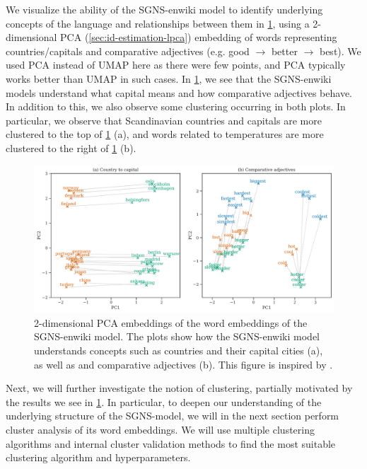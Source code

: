 We visualize the ability of the SGNS-enwiki model to identify underlying concepts of the language and relationships between them in \cref{fig:sgns-enwiki-word-to-word-relations-pca-2d}, using a 2-dimensional PCA (\cref{sec:id-estimation-lpca}) embedding of words representing countries/capitals and comparative adjectives (e.g. good $\rightarrow$ better $\rightarrow$ best). We used PCA instead of UMAP here as there were few points, and PCA typically works better than UMAP in such cases. In \cref{fig:sgns-enwiki-word-to-word-relations-pca-2d}, we see that the SGNS-enwiki models understand what capital means and how comparative adjectives behave. In addition to this, we also observe some clustering occurring in both plots. In particular, we observe that Scandinavian countries and capitals are more clustered to the top of \cref{fig:sgns-enwiki-word-to-word-relations-pca-2d} (a), and words related to temperatures are more clustered to the right of \cref{fig:sgns-enwiki-word-to-word-relations-pca-2d} (b).
\begin{figure}[H]
   \centering
   \includegraphics[width=\textwidth]{thesis/figures/word-to-word-relationships-pca-2d.pdf}
 \caption{2-dimensional PCA embeddings of the word embeddings of the SGNS-enwiki model. The plots show how the SGNS-enwiki model understands concepts such as countries and their capital cities (a), as well as and comparative adjectives (b). This figure is inspired by \cite[Figure 2]{mikolov2013b}.}
 \label{fig:sgns-enwiki-word-to-word-relations-pca-2d}
\end{figure}

Next, we will further investigate the notion of clustering, partially motivated by the results we see in \cref{fig:sgns-enwiki-word-to-word-relations-pca-2d}. In particular, to deepen our understanding of the underlying structure of the SGNS-model, we will in the next section perform cluster analysis of its word embeddings. We will use multiple clustering algorithms and internal cluster validation methods to find the most suitable clustering algorithm and hyperparameters.